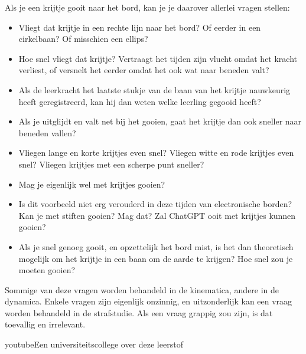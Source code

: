 \documentclass{ximera}
\begin{document}
\begin{example}
Als je een krijtje gooit naar het bord, kan je je daarover allerlei vragen stellen:
\begin{itemize}
\item Vliegt dat krijtje in een rechte lijn naar het bord? Of eerder in een cirkelbaan? Of misschien een ellips?
\item Hoe snel vliegt dat krijtje? Vertraagt het tijden zijn vlucht omdat het kracht verliest, of versnelt het eerder omdat het ook wat naar beneden valt? 
\item Als de leerkracht het laatste stukje van de baan van het krijtje nauwkeurig heeft geregistreerd, kan hij dan weten welke leerling gegooid heeft?
\item Als je uitglijdt en valt net bij het gooien, gaat het krijtje dan ook sneller naar beneden vallen?
\item Vliegen lange en korte krijtjes even snel? Vliegen witte en rode krijtjes even snel? Vliegen krijtjes met een scherpe punt sneller?
\item Mag je eigenlijk wel met krijtjes gooien?
\item Is dit voorbeeld niet erg verouderd in deze tijden van electronische borden? Kan je met stiften gooien? Mag dat? Zal ChatGPT ooit met krijtjes kunnen gooien?
\item Als je snel genoeg gooit, en opzettelijk het bord mist, is het dan theoretisch mogelijk om het krijtje in een baan om de aarde te krijgen? Hoe snel zou je moeten gooien? 
\end{itemize}  

Sommige van deze vragen worden behandeld in de kinematica, andere in de dynamica. Enkele vragen zijn eigenlijk onzinnig, en uitzonderlijk kan een vraag worden behandeld in de strafstudie. Als een vraag grappig zou zijn, is dat toevallig en irrelevant.

\end{example}


\begin{expandable}{youtube}{Een universiteitscollege over deze leerstof}
\end{expandable}





	
\end{document}
